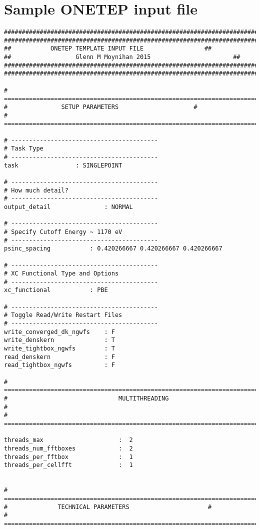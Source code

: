 \section{Sample {\sc ONETEP} input file}
\begin{lstlisting}
##########################################################################
##########################################################################
##			 ONETEP TEMPLATE INPUT FILE	        		##
##  			    Glenn M Moynihan 2015    		        	##
##########################################################################
##########################################################################

# ========================================================================
# 				SETUP PARAMETERS			         #
# ========================================================================

# -----------------------------------------
# Task Type
# -----------------------------------------
task				: SINGLEPOINT

# -----------------------------------------
# How much detail?
# -----------------------------------------
output_detail           	: NORMAL

# -----------------------------------------
# Specify Cutoff Energy ~ 1170 eV
# -----------------------------------------
psinc_spacing 			: 0.420266667 0.420266667 0.420266667

# -----------------------------------------
# XC Functional Type and Options
# -----------------------------------------
xc_functional 			: PBE

# -----------------------------------------
# Toggle Read/Write Restart Files
# -----------------------------------------
write_converged_dk_ngwfs 	: F    
write_denskern       		: T
write_tightbox_ngwfs 		: T
read_denskern        		: F
read_tightbox_ngwfs  		: F

# ========================================================================
#                               MULTITHREADING                                   #
# ========================================================================

threads_max                     :  2   
threads_num_fftboxes            :  2   
threads_per_fftbox              :  1   
threads_per_cellfft             :  1   


# ========================================================================
# 			   TECHNICAL PARAMETERS	        			 #
# ========================================================================


\end{lstlisting}
